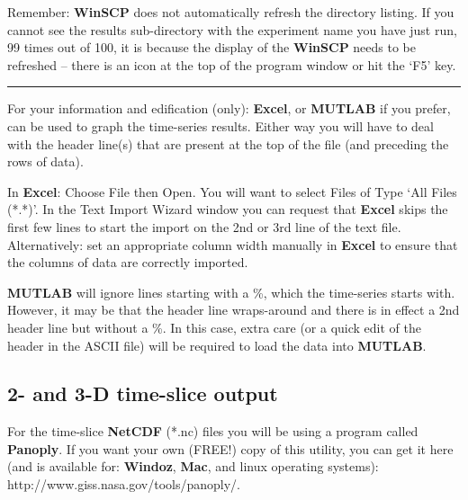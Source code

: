 \vspace{1mm}
Remember: \textbf{WinSCP} does not automatically refresh the directory listing. If you cannot see the results sub-directory with the experiment name you have just run, 99 times out of 100, it is because the display of the \textbf{WinSCP} needs to be refreshed -- there is an icon at the top of the program window or hit the ‘\textsf{\footnotesize F5}’ key.

\vspace{1mm}\noindent\rule{4cm}{0.5pt}\vspace{2mm}

\noindent For your information and edification (only): \textbf{Excel}, or \textbf{MUTLAB} if you prefer, can be used to graph the time-series results. Either way you will have to deal with the header line(s) that are present at the top of the file (and preceding the rows of data).

In \textbf{Excel}: Choose \textsf{\footnotesize File} then \textsf{\footnotesize Open}.  You will want to select \textsf{\footnotesize Files of Type} ‘\textsf{\footnotesize All Files (*.*)}’. In the \textsf{\footnotesize Text Import Wizard} window you can request that \textbf{Excel} skips the first few lines to start the import on the 2nd or 3rd line of the text file. Alternatively: set an appropriate column width manually in \textbf{Excel} to ensure that the columns of data are correctly imported.

\textbf{MUTLAB} will ignore lines starting with a \textsf{\footnotesize \%}, which the time-series starts with. However, it may be that the header line wraps-around and there is in effect a 2nd header line but without a \textsf{\footnotesize \%}. In this case, extra care (or a quick edit of the header in the ASCII file) will be required to load the data into \textbf{MUTLAB}.

\newpage

\subsection{2- and 3-D time-slice output}

For the time-slice \textbf{NetCDF} (*.nc) files you will be using a program called \textbf{Panoply}. If you want your own (FREE!) copy of this utility, you can get it here (and is available for: \textbf{Windoz}, \textbf{Mac}, and linux operating systems): http://www.giss.nasa.gov/tools/panoply/.

